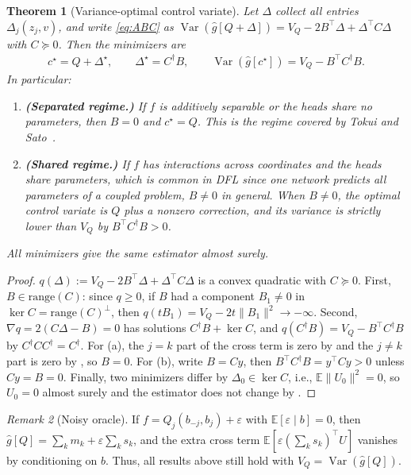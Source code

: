 \documentclass[10pt]{article}
\providecommand{\E}{\mathbb{E}}
\providecommand{\Var}{\operatorname{Var}}
\theoremstyle{plain}
\newtheorem{theorem}{Theorem}[section]
\theoremstyle{definition}
\theoremstyle{remark}
\newtheorem{remark}[theorem]{Remark}
\theoremstyle{definition}
\newcommand{\ctx}[1]{z_{#1}}                 %
\newcommand{\score}[1]{s_{#1}}               %
\newcommand{\ghat}[1]{\hat g[#1]}            %
\newcommand{\Dstar}{\Delta^{\star}}
\newcommand{\cstar}{c^{\star}}
\newcommand{\VQ}{V_{Q}}
\begin{document}
\begin{theorem}[Variance-optimal control variate]\label{thm:optimal}
    Let $\Delta$ collect all entries $\Delta_j(\ctx{j},v)$, and write \eqref{eq:ABC} as $\Var(\ghat{Q+\Delta})=\VQ-2B^{\top}\Delta+\Delta^{\top}C\Delta$ with $C\succeq0$. Then the minimizers are
    \begin{align}
        \cstar = Q + \Dstar, \qquad \Dstar = C^\dagger B, \qquad \Var(\ghat{\cstar}) = \VQ - B^\top C^\dagger B .
    \end{align}
    In particular:
    \begin{enumerate}[label=(\alph*)]
        \item \textbf{(Separated regime.)} If $f$ is additively separable or the heads share no parameters, then $B=0$ and $\cstar=Q$. This is the regime covered by Tokui and Sato~\cite{tokui2017}.
        \item \textbf{(Shared regime.)} If $f$ has interactions across coordinates and the heads share parameters, which is common in DFL since one network predicts all parameters of a coupled problem, $B\neq0$ in general. When $B\neq0$, the optimal control variate is $Q$ plus a nonzero correction, and its variance is strictly lower than $\VQ$ by $B^{\top}C^{\dagger}B>0$.
    \end{enumerate}
    All minimizers give the same estimator almost surely.
\end{theorem}
\begin{proof}
    $q(\Delta):=\VQ-2B^{\top}\Delta+\Delta^{\top}C\Delta$ is a convex quadratic with $C\succeq0$. First, $B\in\mathrm{range}(C)$: since $q\ge0$, if $B$ had a component $B_1\neq0$ in $\ker C=\mathrm{range}(C)^{\perp}$, then $q(tB_1)=\VQ-2t\|B_1\|^2\to-\infty$. Second, $\nabla q=2(C\Delta-B)=0$ has solutions $C^{\dagger}B+\ker C$, and $q(C^{\dagger}B)=\VQ-B^{\top}C^{\dagger}B$ by $C^{\dagger}CC^{\dagger}=C^{\dagger}$. For (a), the $j=k$ part of the cross term is zero by  and the $j\neq k$ part is zero by , so $B=0$. For (b), write $B=Cy$, then $B^{\top}C^{\dagger}B=y^{\top}Cy>0$ unless $Cy=B=0$. Finally, two minimizers differ by $\Delta_0\in\ker C$, i.e., $\E\|U_0\|^2=0$, so $U_0=0$ almost surely and the estimator does not change by .
\end{proof}

\begin{remark}[Noisy oracle]\label{rem:noise}
    If $f=Q_j(b_{-j},b_j)+\varepsilon$ with $\E[\varepsilon\mid b]=0$, then $\ghat{Q}=\sum_k m_k+\varepsilon\sum_k\score{k}$, and the extra cross term $\E[\varepsilon(\sum_k\score{k})^{\top}U]$ vanishes by conditioning on $b$. Thus, all results above still hold with $\VQ=\Var(\ghat{Q})$.
\end{remark}
\end{document}
